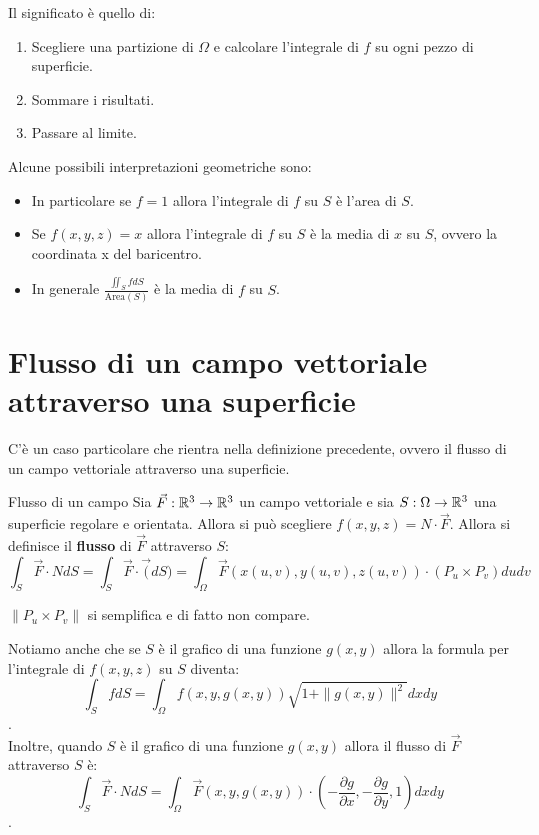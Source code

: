 Il significato è quello di:
\begin{enumerate}
  \item Scegliere una partizione di $\Omega$ e calcolare l'integrale di $f$ su ogni pezzo di superficie.
  \item Sommare i risultati.
  \item Passare al limite.
\end{enumerate}
Alcune possibili interpretazioni geometriche sono:
\begin{itemize}
\item In particolare se $f=1$ allora l'integrale di $f$ su $S$ è l'area di $S$.\\
\item Se $f(x,y,z)=x$ allora l'integrale di $f$ su $S$ è la media di $x$ su $S$, ovvero la coordinata x del baricentro.\\
\item In generale $\frac{\iint_S f dS}{\text{Area}(S)}$ è la media di $f$ su $S$.\\
\end{itemize}

\section{Flusso di un campo vettoriale attraverso una superficie}\label{sec:flusso-superficie}
C'è un caso particolare che rientra nella definizione precedente, ovvero il flusso di un campo vettoriale attraverso una superficie.\\
\begin{definizione}{Flusso di un campo}
  Sia $\vec F:\mathbb{R}^3\to\mathbb{R}^3$ un campo vettoriale e sia $S:\Omega\to\mathbb{R}^3$ una superficie regolare e orientata. Allora si può scegliere $f(x,y,z)=N\cdot \vec F$. Allora si definisce il \textbf{flusso} di $\vec F$ attraverso $S$:
  $$\int_{S} \vec F \cdot N d S = \int_{S} \vec F \cdot \vec (dS) = \int_{\Omega} \vec F(x(u,v),y(u,v),z(u,v))\cdot (P_u\times P_v)dudv$$
\end{definizione}
\begin{osservazione}{}
  $\|P_u \times P_v\|$ si semplifica e di fatto non compare.
\end{osservazione}

Notiamo anche che se $S$ è il grafico di una funzione $g(x,y)$ allora la formula per l'integrale di $f(x,y,z)$ su $S$ diventa:
$$\int_{S} f dS = \int_{\Omega} f(x,y,g(x,y))\sqrt{1+\|g(x,y)\|^2}dxdy$$.\\
Inoltre, quando $S$ è il grafico di una funzione $g(x,y)$ allora il flusso di $\vec F$ attraverso $S$ è:
$$\int_{S} \vec F \cdot N d S = \int_{\Omega} \vec F(x,y,g(x,y))\cdot \left(-\frac{\partial g}{\partial x},-\frac{\partial g}{\partial y},1\right)dxdy$$.\\
